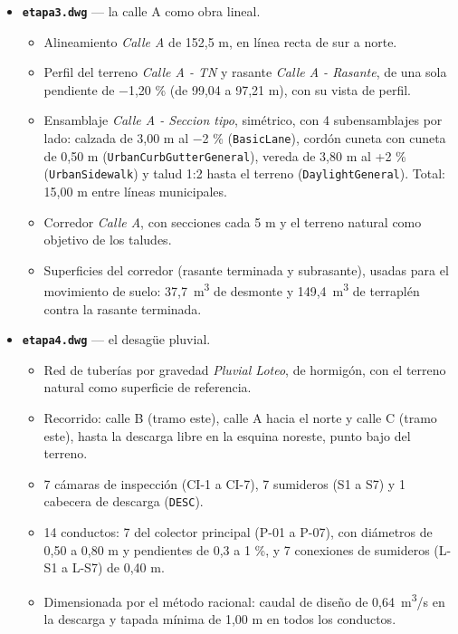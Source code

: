 \documentclass[12pt, a4paper]{article}
\begin{document}
\begin{itemize}[itemsep=8pt]
  \item \textbf{\texttt{etapa3.dwg}} --- la calle A como obra lineal.
  \begin{itemize}[itemsep=2pt]
    \item Alineamiento \textit{Calle A} de 152,5 m, en línea recta de sur a norte.
    \item Perfil del terreno \textit{Calle A - TN} y rasante \textit{Calle A - Rasante}, de
    una sola pendiente de $-$1,20 \% (de 99,04 a 97,21 m), con su vista de perfil.
    \item Ensamblaje \textit{Calle A - Seccion tipo}, simétrico, con 4 subensamblajes por
    lado: calzada de 3,00 m al $-$2 \% (\texttt{BasicLane}), cordón cuneta con cuneta de
    0,50 m (\texttt{UrbanCurbGutterGeneral}), vereda de 3,80 m al +2 \%
    (\texttt{UrbanSidewalk}) y talud 1:2 hasta el terreno (\texttt{DaylightGeneral}).
    Total: 15,00 m entre líneas municipales.
    \item Corredor \textit{Calle A}, con secciones cada 5 m y el terreno natural como
    objetivo de los taludes.
    \item Superficies del corredor (rasante terminada y subrasante), usadas para el
    movimiento de suelo: 37,7~m\textsuperscript{3} de desmonte y 149,4~m\textsuperscript{3}
    de terraplén contra la rasante terminada.
  \end{itemize}

  \item \textbf{\texttt{etapa4.dwg}} --- el desagüe pluvial.
  \begin{itemize}[itemsep=2pt]
    \item Red de tuberías por gravedad \textit{Pluvial Loteo}, de hormigón, con el terreno
    natural como superficie de referencia.
    \item Recorrido: calle B (tramo este), calle A hacia el norte y calle C (tramo este),
    hasta la descarga libre en la esquina noreste, punto bajo del terreno.
    \item 7 cámaras de inspección (CI-1 a CI-7), 7 sumideros (S1 a S7) y 1 cabecera de
    descarga (\texttt{DESC}).
    \item 14 conductos: 7 del colector principal (P-01 a P-07), con diámetros de 0,50 a
    0,80 m y pendientes de 0,3 a 1 \%, y 7 conexiones de sumideros (L-S1 a L-S7) de 0,40 m.
    \item Dimensionada por el método racional: caudal de diseño de
    0,64~m\textsuperscript{3}/s en la descarga y tapada mínima de 1,00 m en todos los conductos.
  \end{itemize}


\end{itemize}
\end{document}
